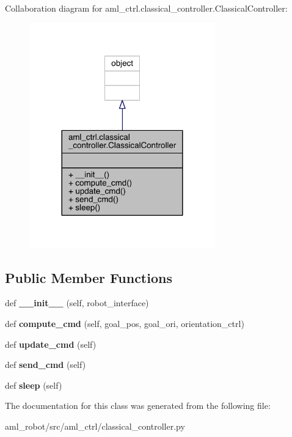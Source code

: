 Collaboration diagram for aml\+\_\+ctrl.\+classical\+\_\+controller.\+Classical\+Controller\+:
\nopagebreak
\begin{figure}[H]
\begin{center}
\leavevmode
\includegraphics[width=228pt]{classaml__ctrl_1_1classical__controller_1_1_classical_controller__coll__graph}
\end{center}
\end{figure}
\subsection*{Public Member Functions}
\begin{DoxyCompactItemize}
\item 
\hypertarget{classaml__ctrl_1_1classical__controller_1_1_classical_controller_a652f6f673d2d455dc751f1d9f5b2235e}{}\label{classaml__ctrl_1_1classical__controller_1_1_classical_controller_a652f6f673d2d455dc751f1d9f5b2235e} 
def {\bfseries \+\_\+\+\_\+init\+\_\+\+\_\+} (self, robot\+\_\+interface)
\item 
\hypertarget{classaml__ctrl_1_1classical__controller_1_1_classical_controller_a3706654f88e9cea399c7b5912662af68}{}\label{classaml__ctrl_1_1classical__controller_1_1_classical_controller_a3706654f88e9cea399c7b5912662af68} 
def {\bfseries compute\+\_\+cmd} (self, goal\+\_\+pos, goal\+\_\+ori, orientation\+\_\+ctrl)
\item 
\hypertarget{classaml__ctrl_1_1classical__controller_1_1_classical_controller_a25b72cfd5c2bd9d9c9dbc9a2ef19d09f}{}\label{classaml__ctrl_1_1classical__controller_1_1_classical_controller_a25b72cfd5c2bd9d9c9dbc9a2ef19d09f} 
def {\bfseries update\+\_\+cmd} (self)
\item 
\hypertarget{classaml__ctrl_1_1classical__controller_1_1_classical_controller_a0ae03e19f0583e154f65cabcab0b84c8}{}\label{classaml__ctrl_1_1classical__controller_1_1_classical_controller_a0ae03e19f0583e154f65cabcab0b84c8} 
def {\bfseries send\+\_\+cmd} (self)
\item 
\hypertarget{classaml__ctrl_1_1classical__controller_1_1_classical_controller_a355da8c44f2f193aa2fda6f1bbf3bafb}{}\label{classaml__ctrl_1_1classical__controller_1_1_classical_controller_a355da8c44f2f193aa2fda6f1bbf3bafb} 
def {\bfseries sleep} (self)
\end{DoxyCompactItemize}


The documentation for this class was generated from the following file\+:\begin{DoxyCompactItemize}
\item 
aml\+\_\+robot/src/aml\+\_\+ctrl/classical\+\_\+controller.\+py\end{DoxyCompactItemize}

